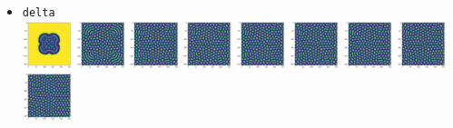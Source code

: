 \begin{itemize}
\item {\tt delta}\\
\includegraphics[height=1.4cm]{python_codes/fieldstone_171/pearson93_rand/delta_solution_0001000_u}
\includegraphics[height=1.4cm]{python_codes/fieldstone_171/pearson93_rand/delta_solution_0005000_u}
\includegraphics[height=1.4cm]{python_codes/fieldstone_171/pearson93_rand/delta_solution_0010000_u}
\includegraphics[height=1.4cm]{python_codes/fieldstone_171/pearson93_rand/delta_solution_0015000_u}
\includegraphics[height=1.4cm]{python_codes/fieldstone_171/pearson93_rand/delta_solution_0020000_u}
\includegraphics[height=1.4cm]{python_codes/fieldstone_171/pearson93_rand/delta_solution_0030000_u}
\includegraphics[height=1.4cm]{python_codes/fieldstone_171/pearson93_rand/delta_solution_0040000_u}
\includegraphics[height=1.4cm]{python_codes/fieldstone_171/pearson93_rand/delta_solution_0050000_u}
\includegraphics[height=1.4cm]{python_codes/fieldstone_171/pearson93_rand/delta_solution_final_u}\\

\end{itemize}
